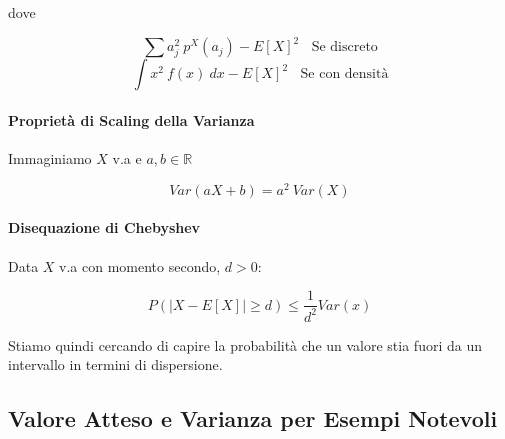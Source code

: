 \documentclass{article}
\begin{document}
dove

\[ \sum a^{2}_{j}\: p^{X}(a_{j}) - E[X]^{2} \:\:\:\: \text{Se discreto} \]
\[ \int x^{2}\: f(x)\:dx - E[X]^{2} \:\:\:\: \text{Se con densità}\]

\paragraph{Proprietà di Scaling della Varianza} Immaginiamo $X$ v.a e $a,b \in \mathbb{R}$

\[ Var(aX + b) = a^{2} \: Var(X) \] 

\paragraph{Disequazione di Chebyshev}

Data $X$ v.a con momento secondo, $d > 0$:

\[ P(|X - E[X]| \geq d) \leq \frac{1}{d^{2}}Var(x) \]

Stiamo quindi cercando di capire la probabilità che un valore stia fuori da un intervallo in termini di dispersione.

\newpage

\subsection{Valore Atteso e Varianza per Esempi Notevoli}
\end{document}
